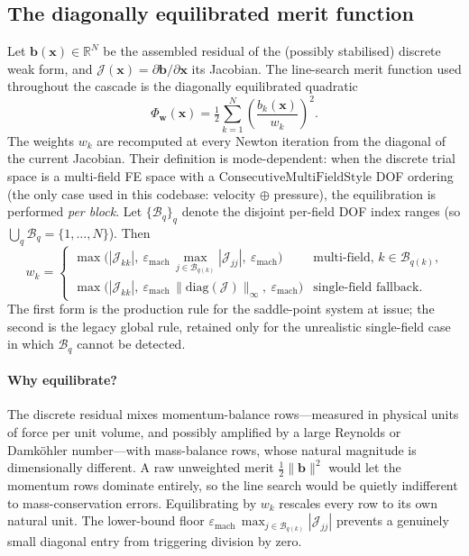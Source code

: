 \documentclass{article}
\begin{document}
\subsection{The diagonally equilibrated merit function}
\label{sec:merit}

Let $\boldsymbol{b}(\boldsymbol{x}) \in \mathbb{R}^N$ be the assembled
residual of the (possibly stabilised) discrete weak form, and
$\mathcal{J}(\boldsymbol{x}) = \partial \boldsymbol{b}/\partial \boldsymbol{x}$
its Jacobian. The line-search merit function used throughout the
cascade is the diagonally equilibrated quadratic
\begin{equation}
    \label{eq:merit}
    \Phi_{\boldsymbol{w}}(\boldsymbol{x})
        = \tfrac{1}{2} \sum_{k=1}^{N}
            \left( \frac{b_k(\boldsymbol{x})}{w_k} \right)^{2}.
\end{equation}
The weights $w_k$ are recomputed at every Newton iteration from the
diagonal of the current Jacobian. Their definition is mode-dependent:
when the discrete trial space is a multi-field FE space with a
$\mathrm{ConsecutiveMultiFieldStyle}$ DOF ordering (the only case used
in this codebase: velocity $\oplus$ pressure), the equilibration is
performed \emph{per block}. Let $\{\mathcal{B}_q\}_{q}$ denote the
disjoint per-field DOF index ranges (so $\bigcup_q \mathcal{B}_q
= \{1,\dots,N\}$). Then
\begin{equation}
    \label{eq:merit-weights}
    w_k =
    \begin{cases}
        \max\!\bigl(|\mathcal{J}_{kk}|,\ \varepsilon_{\mathrm{mach}}\,
            \max_{j \in \mathcal{B}_{q(k)}} |\mathcal{J}_{jj}|,\
            \varepsilon_{\mathrm{mach}} \bigr)
            & \text{multi-field, $k \in \mathcal{B}_{q(k)}$,} \\[1mm]
        \max\!\bigl(|\mathcal{J}_{kk}|,\ \varepsilon_{\mathrm{mach}}\,
            \|\mathrm{diag}(\mathcal{J})\|_\infty,\
            \varepsilon_{\mathrm{mach}} \bigr)
            & \text{single-field fallback.}
    \end{cases}
\end{equation}
The first form is the production rule for the saddle-point system at
issue; the second is the legacy global rule, retained only for the
unrealistic single-field case in which $\mathcal{B}_q$ cannot be
detected.

\paragraph{Why equilibrate?}  The discrete residual mixes momentum-balance
rows---measured in physical units of force per unit volume, and possibly
amplified by a large Reynolds or Damk\"ohler number---with mass-balance
rows, whose natural magnitude is dimensionally different. A raw unweighted
merit $\tfrac{1}{2}\|\boldsymbol{b}\|^2$ would let the momentum rows
dominate entirely, so the line search would be quietly indifferent to
mass-conservation errors. Equilibrating by $w_k$ rescales every row to
its own natural unit. The lower-bound floor
$\varepsilon_{\mathrm{mach}}\,\max_{j \in \mathcal{B}_{q(k)}} |\mathcal{J}_{jj}|$
prevents a genuinely small diagonal entry from triggering division by
zero.
\end{document}
